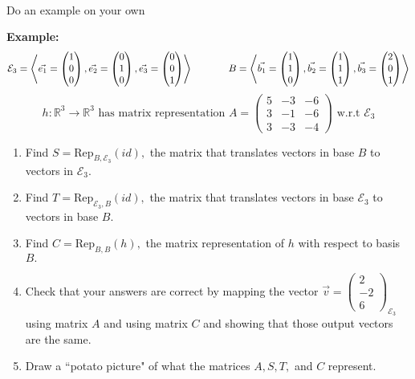 \documentclass[11pt,fleqn]{article}
\begin{document}
\renewcommand{\headrulewidth}{0pt}
\newcommand{\blank}[1]{\rule{#1}{0.75pt}}
\renewcommand{\d}{\displaystyle}

\newcommand{\bpm}{\begin{pmatrix}}
\newcommand{\epm}{\end{pmatrix}}
\newcommand{\bbm}{\begin{bmatrix}}
\newcommand{\ebm}{\end{bmatrix}}

\vspace*{-0.7in}

\begin{center}
  \large {}\\
  
  Do an example on your own
  
  \end{center}
\textbf{Example:}  $$\mathcal{E}_3=\left\langle \vec{e_1}=\bpm 1\\0\\0 \epm,\vec{e_2}=\bpm 0\\1\\0\epm,\vec{e_3}=\bpm 0\\0\\1 \epm \right\rangle \hspace{.5in} B=\left\langle \vec{b_1}=\bpm 1\\1\\0\epm, \vec{b_2}=\bpm1\\1\\1 \epm, \vec{b_3}=\bpm 2\\0\\1\epm \right\rangle$$ 
$$h:\mathbb{R}^3 \to \mathbb{R}^3 \text{ has matrix representation } A=\bpm  5&-3&-6 \\ 3&-1&-6 \\ 3&-3&-4\epm \text{ w.r.t } \mathcal{E}_3$$ 
\begin{enumerate}
\item Find $S=\text{Rep}_{B,\mathcal{E}_3}(id),$ the matrix that translates vectors in base $B$ to vectors in $\mathcal{E}_3$.
\vfill
\item Find $T=\text{Rep}_{\mathcal{E}_3,B}(id),$ the matrix that translates vectors in base $\mathcal{E}_3$ to vectors in base $B.$
\vfill
\item Find $C=\text{Rep}_{B,B}(h),$ the matrix representation of $h$ with respect to basis $B.$
\vfill
\newpage
\item Check that your answers are correct by mapping the vector $\vec{v}=\bpm 2\\-2\\6 \epm_{\mathcal{E}_3}$ using matrix $A$ and using matrix $C$ and showing that those output vectors are the same.
\newpage
\item Draw a ``potato picture" of what the matrices $A, S,T,$ and $C$ represent.
\vfill
\end{enumerate}
\end{document}
